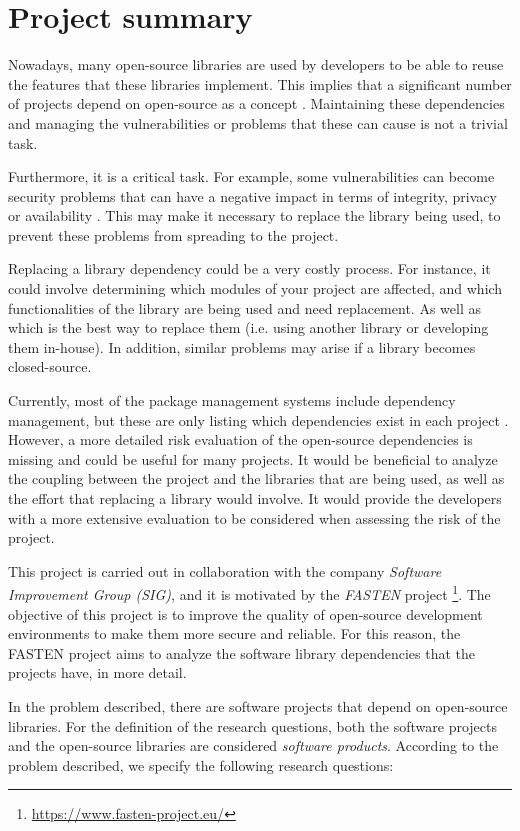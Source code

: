 \section{Project summary} \label{section:project-summary} %
Nowadays, many open-source libraries are used by developers to be able to reuse the features that these libraries implement.
This implies that a significant number of projects depend on open-source as a concept \cite{kula2014visualizing}.
Maintaining these dependencies and managing the vulnerabilities or problems that these can cause is not a trivial task.

Furthermore, it is a critical task. For example, some vulnerabilities can become security problems that can have a negative impact in terms of integrity, privacy or availability \cite{CVE-FAQ}. This may make it necessary to replace the library being used, to prevent these problems from spreading to the project.

Replacing a library dependency could be a very costly process. For instance, it could involve determining which modules of your project are affected, and which functionalities of the library are being used and need replacement. As well as which is the best way to replace them (i.e. using another library or developing them in-house).
In addition, similar problems may arise if a library becomes closed-source.

Currently, most of the package management systems include dependency management, but these are only listing which dependencies exist in each project \cite{hejderup2018prazi}.
However, a more detailed risk evaluation of the open-source dependencies is missing and could be useful for many projects.
It would be beneficial to analyze the coupling between the project and the libraries that are being used, as well as the effort that replacing a library would involve. It would provide the developers with a more extensive evaluation to be considered when assessing the risk of the project.

This project is carried out in collaboration with the company \textit{Software Improvement Group (SIG)}, and it is motivated by the \textit{FASTEN} project \footnote{\url{https://www.fasten-project.eu/}}. The objective of this project is to improve the quality of open-source development environments to make them more secure and reliable. For this reason, the FASTEN project aims to analyze the software library dependencies that the projects have, in more detail.

\newpage\noindent
In the problem described, there are software projects that depend on open-source libraries. For the definition of the research questions, both the software projects and the open-source libraries are considered \textit{software products}. According to the problem described, we specify the following research questions:

